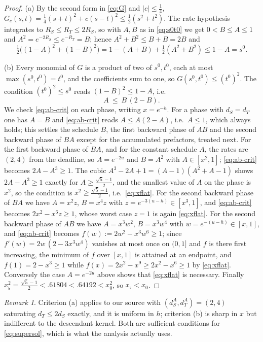 \documentclass[11pt]{article}
\theoremstyle{plain}
\theoremstyle{definition}
\theoremstyle{remark}
\newtheorem{remark}[theorem]{Remark}
\begin{document}
\begin{proof}
(a) By the second form in \eqref{eq:G} and $|c|\le\tfrac14$,
$G_c(s,t)=\tfrac14(s+t)^2+c(s-t)^2\le\tfrac12(s^2+t^2)$. The rate hypothesis
integrates to $R_S\le R_T\le2R_S$, so with $A,B$ as in \eqref{eq:s0t0} we get
$0<B\le A\le1$ and $A^2=e^{-2R_S}\le e^{-R_T}=B$; hence $A^2+B^2\le B+B=2B$ and
\[
 \tfrac12\bigl((1-A)^2+(1-B)^2\bigr)=1-(A+B)+\tfrac12(A^2+B^2)\le1-A=s^0 .
\]

(b) Every monomial of $G$ is a product of two of $s^0,t^0$, each at most
$\max(s^0,t^0)=t^0$, and the coefficients sum to one, so
$G(s^0,t^0)\le (t^0)^2$. The condition $(t^0)^2\le s^0$ reads
$(1-B)^2\le1-A$, i.e.
\begin{equation}\label{eq:ab-crit}
 A\ \le\ B\,(2-B).
\end{equation}
We check \eqref{eq:ab-crit} on each phase, writing $x=e^{-h}$.
For a phase with $d_S=d_T$ one has $A=B$ and \eqref{eq:ab-crit} reads
$A\le A(2-A)$, i.e.\ $A\le1$, which always holds; this settles the schedule
$B$, the first backward phase of $AB$ and the second backward phase of $BA$
except for the accumulated prefactors, treated next.
For the first backward phase of $BA$, and for the constant schedule $A$, the
rates are $(2,4)$ from the deadline, so $A=e^{-2u}$ and $B=A^2$ with
$A\in[x^2,1]$; \eqref{eq:ab-crit} becomes $2A-A^3\ge1$. The cubic
$A^3-2A+1=(A-1)(A^2+A-1)$ shows $2A-A^3\ge1$ exactly for
$A\ge\tfrac{\sqrt5-1}{2}$, and the smallest value of $A$ on the phase is
$x^2$, so the condition is $x^2\ge\tfrac{\sqrt5-1}{2}$, i.e.\ \eqref{eq:xflat}.
For the second backward phase of $BA$ we have $A=x^2z$, $B=x^4z$ with
$z=e^{-3(u-h)}\in[x^3,1]$, and \eqref{eq:ab-crit} becomes
$2x^2-x^6z\ge1$, whose worst case $z=1$ is again \eqref{eq:xflat}.
For the second backward phase of $AB$ we have $A=x^3w^2$, $B=x^3w^4$ with
$w=e^{-(u-h)}\in[x,1]$, and \eqref{eq:ab-crit} becomes $f(w):=2w^2-x^3w^6\ge1$;
since $f'(w)=2w\,(2-3x^3w^4)$ vanishes at most once on $(0,1]$ and $f$ is there
first increasing, the minimum of $f$ over $[x,1]$ is attained at an endpoint,
and $f(1)=2-x^3\ge1$ while $f(x)=2x^2-x^9\ge2x^2-x^6\ge1$ by \eqref{eq:xflat}.
Conversely the case $A=e^{-2u}$ above shows that \eqref{eq:xflat} is necessary.
Finally $x_\flat^2=\tfrac{\sqrt5-1}{2}<.61804<.64192<x_0^2$, so
$x_\flat<x_0$.
\end{proof}

\begin{remark}
Criterion (a) applies to our source with $(d^A_S,d^A_T)=(2,4)$ saturating
$d_T\le2d_S$ exactly, and it is uniform in $h$; criterion (b) is sharp in $x$
but indifferent to the descendant kernel. Both are sufficient conditions for
\eqref{eq:supersol}, which is what the analysis actually uses.
\end{remark}
\end{document}
